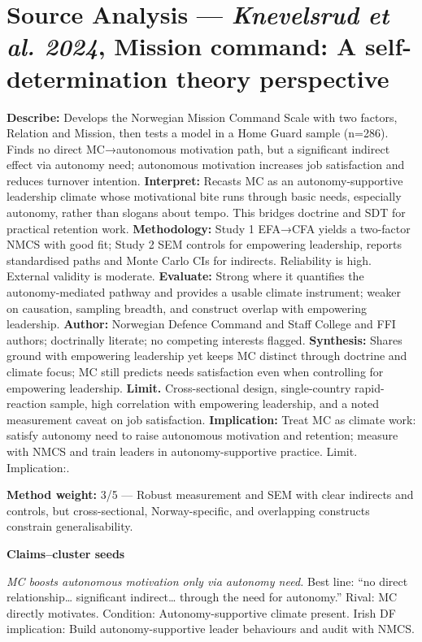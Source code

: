 \parencite{KNEVELSRUD_2024}

\section*{Source Analysis — \textit{Knevelsrud et al. 2024}, Mission command: A self-determination theory perspective}
\textbf{Describe:} Develops the Norwegian Mission Command Scale with two factors, Relation and Mission, then tests a model in a Home Guard sample (n=286). Finds no direct MC→autonomous motivation path, but a significant indirect effect via autonomy need; autonomous motivation increases job satisfaction and reduces turnover intention.
\textbf{Interpret:} Recasts MC as an autonomy-supportive leadership climate whose motivational bite runs through basic needs, especially autonomy, rather than slogans about tempo. This bridges doctrine and SDT for practical retention work.
\textbf{Methodology:} Study 1 EFA→CFA yields a two-factor NMCS with good fit; Study 2 SEM controls for empowering leadership, reports standardised paths and Monte Carlo CIs for indirects. Reliability is high. External validity is moderate.
\textbf{Evaluate:} Strong where it quantifies the autonomy-mediated pathway and provides a usable climate instrument; weaker on causation, sampling breadth, and construct overlap with empowering leadership.
\textbf{Author:} Norwegian Defence Command and Staff College and FFI authors; doctrinally literate; no competing interests flagged.
\textbf{Synthesis:} Shares ground with empowering leadership yet keeps MC distinct through doctrine and climate focus; MC still predicts needs satisfaction even when controlling for empowering leadership.
\textbf{Limit.} Cross-sectional design, single-country rapid-reaction sample, high correlation with empowering leadership, and a noted measurement caveat on job satisfaction.
\textbf{Implication:} Treat MC as climate work: satisfy autonomy need to raise autonomous motivation and retention; measure with NMCS and train leaders in autonomy-supportive practice. Limit. Implication:.

\textbf{Method weight:} 3/5 — Robust measurement and SEM with clear indirects and controls, but cross-sectional, Norway-specific, and overlapping constructs constrain generalisability.

\textbf{Claims–cluster seeds}

\textit{MC boosts autonomous motivation only via autonomy need.} Best line: “no direct relationship… significant indirect… through the need for autonomy.” Rival: MC directly motivates. Condition: Autonomy-supportive climate present. Irish DF implication: Build autonomy-supportive leader behaviours and audit with NMCS.

